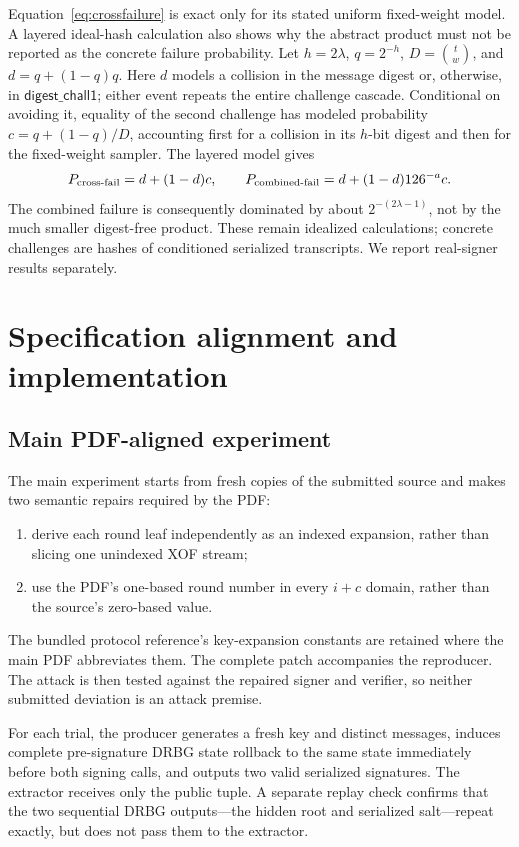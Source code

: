 \documentclass[11pt,a4paper]{article}
\begin{document}
Equation~\eqref{eq:crossfailure} is exact only for its stated uniform
fixed-weight model.  A layered ideal-hash calculation also shows why the
abstract product must not be reported as the concrete failure probability.
Let $h=2\lambda$, $q=2^{-h}$, $D=\binom{t}{w}$, and
$d=q+(1-q)q$.  Here $d$ models a collision in the message digest or,
otherwise, in $\mathsf{digest\_chall1}$; either event repeats the entire
challenge cascade.  Conditional on avoiding it, equality of the second
challenge has modeled probability $c=q+(1-q)/D$, accounting first for a
collision in its $h$-bit digest and then for the fixed-weight sampler.  The
layered model gives
\[
 P_{\rm cross\text{-}fail}=d+(1-d)c,\qquad
 P_{\rm combined\text{-}fail}=d+(1-d)126^{-a}c.
\]
The combined failure is consequently dominated by about $2^{-(2\lambda-1)}$,
not by the much smaller digest-free product.  These remain idealized
calculations; concrete challenges are hashes of conditioned serialized
transcripts.  We report real-signer results separately.

\section{Specification alignment and implementation}

\subsection{Main PDF-aligned experiment}

The main experiment starts from fresh copies of the submitted source and makes
two semantic repairs required by the PDF:
\begin{enumerate}[leftmargin=*,itemsep=2pt]
  \item derive each round leaf independently as an indexed expansion, rather
        than slicing one unindexed XOF stream;
  \item use the PDF's one-based round number in every $i+c$ domain, rather than
        the source's zero-based value.
\end{enumerate}
The bundled protocol reference's key-expansion constants are retained where
the main PDF abbreviates them.  The complete patch accompanies the reproducer.
The attack is then tested against the repaired signer and verifier, so neither
submitted deviation is an attack premise.

For each trial, the producer generates a fresh key and distinct messages,
induces complete pre-signature DRBG state rollback to the same state immediately
before both signing calls, and outputs two valid serialized signatures.  The extractor receives
only the public tuple.  A separate replay check confirms that the two
sequential DRBG outputs---the hidden root and serialized salt---repeat exactly,
but does not pass them to the extractor.
\end{document}
